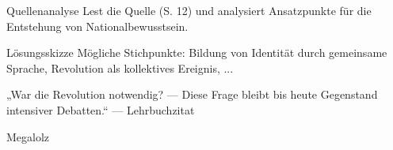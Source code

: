 \documentclass[11pt,a4paper,oneside]{article}
\begin{document}
	\begin{histaufgabe}{Quellenanalyse}
		Lest die Quelle (S. 12) und analysiert Ansatzpunkte für die Entstehung von Nationalbewusstsein.
	\end{histaufgabe}
	
	\begin{histloesung}{Lösungsskizze}
		Mögliche Stichpunkte: Bildung von Identität durch gemeinsame Sprache, Revolution als kollektives Ereignis, ...
	\end{histloesung}
	
	\begin{quoteBox}
		„War die Revolution notwendig? — Diese Frage bleibt bis heute Gegenstand intensiver Debatten.“ — Lehrbuchzitat
	\end{quoteBox}
	
	Megalolz
	
\end{document}
